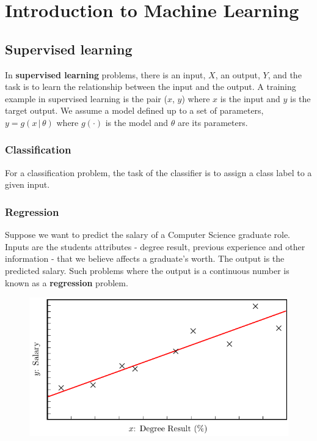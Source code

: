 \documentclass[11pt,fleqn]{book} %
\begin{document}


\chapter{Introduction to Machine Learning}

\section{Supervised learning}
In \textbf{supervised learning} problems, there is an input, $X$, an output, $Y$, and the task is to learn the relationship between the input and the output. A training example in supervised learning is the pair ($x$, $y$) where $x$ is the input and $y$ is the target output. We assume a model defined up to a set of parameters, $y = g(x \, \vert \, \theta)$ where $g(\cdot)$ is the model and $\theta$ are its parameters.
\subsection{Classification}
For a classification problem, the task of the classifier is to assign a class label to a given input.


\subsection{Regression}
Suppose we want to predict the salary of a Computer Science graduate role. Inputs are the students attributes - degree result, previous experience and other information - that we believe affects a graduate's worth. The output is the predicted salary. Such problems where the output is a continuous number is known as a \textbf{regression} problem.\\

\begin{figure}[h!]
	\centering
  	\includegraphics{Pictures/graph1.pdf}
\end{figure}
\end{document}
